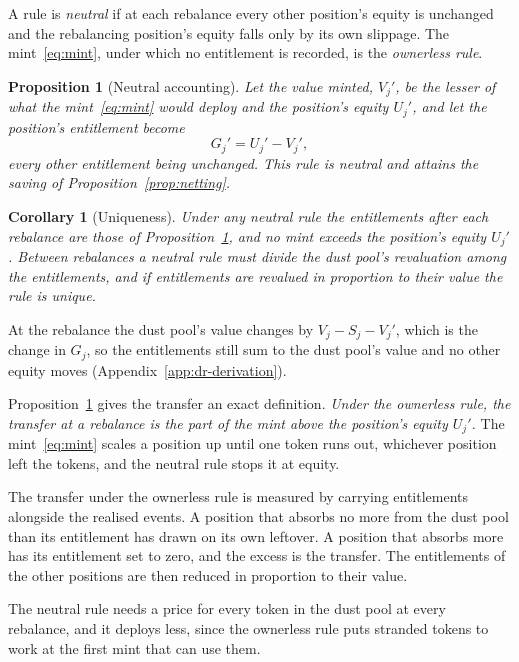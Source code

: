 \documentclass[11pt,a4paper]{article}
\theoremstyle{siphon}
\newtheorem{corollary}{Corollary}[theorem]
\newtheorem{proposition}[theorem]{Proposition}
\begin{document}
A rule is \emph{neutral} if at each rebalance every other position's equity is unchanged and the rebalancing position's equity falls only by its own slippage. The mint~\eqref{eq:mint}, under which no entitlement is recorded, is the \emph{ownerless rule}.

\begin{proposition}[Neutral accounting]\label{prop:neutral}
Let the value minted, $V_j'$, be the lesser of what the mint~\eqref{eq:mint} would deploy and the position's equity $U_j'$, and let the position's entitlement become
\[
G_j' = U_j' - V_j' ,
\]
every other entitlement being unchanged. This rule is neutral and attains the saving of Proposition~\ref{prop:netting}.
\end{proposition}

\begin{corollary}[Uniqueness]\label{cor:unique}
Under any neutral rule the entitlements after each rebalance are those of Proposition~\ref{prop:neutral}, and no mint exceeds the position's equity $U_j'$. Between rebalances a neutral rule must divide the dust pool's revaluation among the entitlements, and if entitlements are revalued in proportion to their value the rule is unique.
\end{corollary}

\noindent At the rebalance the dust pool's value changes by $V_j - S_j - V_j'$, which is the change in $G_j$, so the entitlements still sum to the dust pool's value and no other equity moves (Appendix~\ref{app:dr-derivation}).

Proposition~\ref{prop:neutral} gives the transfer an exact definition. \emph{Under the ownerless rule, the transfer at a rebalance is the part of the mint above the position's equity $U_j'$.} The mint~\eqref{eq:mint} scales a position up until one token runs out, whichever position left the tokens, and the neutral rule stops it at equity.

The transfer under the ownerless rule is measured by carrying entitlements alongside the realised events. A position that absorbs no more from the dust pool than its entitlement has drawn on its own leftover. A position that absorbs more has its entitlement set to zero, and the excess is the transfer. The entitlements of the other positions are then reduced in proportion to their value.

The neutral rule needs a price for every token in the dust pool at every rebalance, and it deploys less, since the ownerless rule puts stranded tokens to work at the first mint that can use them.
\end{document}
